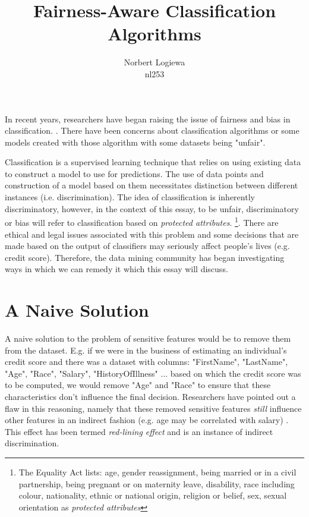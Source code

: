 \documentclass[a4paper, 12pt, notitlepage]{article}
\date{} %
\author{Norbert Logiewa\\nl253}
\title{Fairness-Aware Classification Algorithms}
\begin{document}
\maketitle

In recent years, researchers have began raising the issue of fairness and bias in classification. \cite{pedreshi2008}. There have been concerns about classification algorithms or some models created with those algorithm with some datasets being "unfair".

Classification is a supervised learning technique that relies on using existing data to construct a model to use for predictions. The use of data points and construction of a model based on them necessitates distinction between different instances (i.e. discrimination). The idea of classification is inherently discriminatory, however, in the context of this essay, to be unfair, discriminatory or bias will refer to classification based on \emph{protected attributes}. \footnote{The Equality Act lists: age, gender reassignment, being married or in a civil partnership, being pregnant or on maternity leave, disability, race including colour, nationality, ethnic or national origin, religion or belief, sex, sexual orientation as \emph{protected attributes}}. There are ethical and legal issues associated with this problem and some decisions that are made based on the output of classifiers may seriously affect people's lives (e.g. credit score). Therefore, the data mining community has began investigating ways in which we can remedy it which this essay will discuss.



\section*{A Naive Solution}

A naive solution to the problem of sensitive features would be to remove them from the dataset. E.g. if we were in the business of estimating an individual's credit score and there was a dataset with columns: "FirstName", "LastName", "Age", "Race", "Salary", "HistoryOfIllness" ... based on which the credit score was to be computed, we would remove "Age" and "Race" to ensure that these characteristics don't influence the final decision.
Researchers have pointed out a flaw in this reasoning, namely that these removed sensitive features \emph{still} influence other features in an indirect fashion (e.g. age may be correlated with salary) \cite[p.~36]{kamishima2012a} \cite[p.~378]{kamishima2012b} \cite[p.~381]{kamishima2012b}. This effect has been termed \emph{red-lining effect} and is an instance of indirect discrimination. \cite[p.~380]{kamishima2012b}
\end{document}
